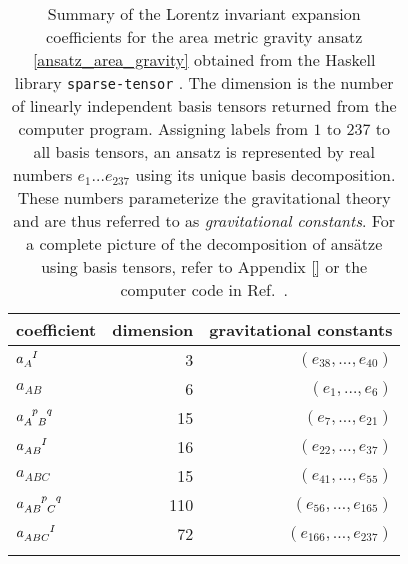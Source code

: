 \begin{table}
  \centering
  \begin{tabular}{l r r}
    \toprule
    coefficient & dimension & gravitational constants \\
    \midrule
    $a_A^{\hphantom AI}$ & 3 & $(e_{38},\dots ,e_{40})$ \\ \addlinespace[2pt]
    $a_{AB}$ & 6 & $(e_{1},\dots ,e_{6})$ \\ \addlinespace[2pt]
    $a_{A\hphantom pB}^{\hphantom Ap\hphantom Bq}$ & 15 & $(e_{7},\dots ,e_{21})$ \\ \addlinespace[2pt]
    $a_{AB}^{\hphantom{AB}I}$ & 16 & $(e_{22},\dots ,e_{37})$ \\ \addlinespace[2pt]
    $a_{ABC}$ & 15 & $(e_{41},\dots ,e_{55})$ \\ \addlinespace[2pt]
    $a_{AB\hphantom pC}^{\hphantom{AB}p\hphantom Cq}$ & 110 & $(e_{56},\dots ,e_{165})$ \\ \addlinespace[2pt]
    $a_{ABC}^{\hphantom{ABC}I}$ & 72 & $(e_{166},\dots ,e_{237})$ \\ \addlinespace[2pt]
    \bottomrule 
  \end{tabular}
  \caption{Summary of the Lorentz invariant expansion coefficients for the area metric gravity ansatz \eqref{ansatz_area_gravity} obtained from the Haskell library \texttt{sparse-tensor} \cite{}. The dimension is the number of linearly independent basis tensors returned from the computer program. Assigning labels from $1$ to $237$ to all basis tensors, an ansatz is represented by real numbers $e_1\dots e_{237}$ using its unique basis decomposition. These numbers parameterize the gravitational theory and are thus referred to as \emph{gravitational constants}. For a complete picture of the decomposition of ansätze using basis tensors, refer to Appendix \ref{} or the computer code in Ref.~\cite{second-order-area-repo}.}
\end{table}

